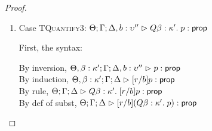 \begin{proof}
\begin{enumerate}
  For semantics, consider
  $\interp{\judgeA[\Theta; \Gamma; \Delta]
                  {[r/b](Q x:A.\;p)}{\assert}}\;\theta\;\gamma\;\delta$ 
  \begin{eqnproof}
          {Semantics}
          {Induction}
          {Semantics}
  \end{eqnproof}
  Here, we make use of the fact that $x$ is not free in $r$, and we silently permute the context as 
  needed. 

\item Case \textsc{TQuantify3}: $\judgeA[\Theta; \Gamma; \Delta, b:\upsilon'']{Q \beta:\kappa'.\;p}{\assert}$
  
  First, the syntax:
  \begin{tabbedproof}
    \oo By inversion, $\judgeA[\Theta, \beta:\kappa'; \Gamma; \Delta, b:\upsilon'']{p}{\assert}$ \\
    \oo By induction, $\judgeA[\Theta, \beta:\kappa'; \Gamma; \Delta]{[r/b]p}{\assert}$ \\
    \oo By rule, $\judgeA[\Theta; \Gamma; \Delta]
                         {Q \beta:\kappa'.\;[r/b]p}{\assert}$ \\
    \oo By def of subst, $\judgeA[\Theta; \Gamma; \Delta]
                                 {[r/b](Q \beta:\kappa'.\;p)}{\assert}$ 
  \end{tabbedproof}


\end{enumerate}
\end{proof}
